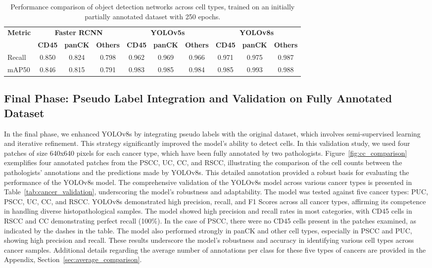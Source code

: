 \documentclass{midl} %
\begin{document}
\begin{table}[!htbp]
\centering
\caption{Performance comparison of object detection networks across cell types, trained on an initially partially annotated dataset with 250 epochs.}%
  \begin{tabular}{l|ccc|ccc|ccc}
  \toprule
  \bfseries Metric & \multicolumn{3}{c|}{\bfseries Faster RCNN} & \multicolumn{3}{c|}{\bfseries YOLOv5s} & \multicolumn{3}{c}{\bfseries YOLOv8s}\\
  & {\small \bfseries CD45} & {\small \bfseries panCK} & {\small \bfseries Others} & {\small \bfseries CD45} & {\small \bfseries panCK} & {\small \bfseries Others} & {\small \bfseries CD45} & {\small \bfseries panCK} & {\small \bfseries Others}\\
  Recall & 0.850 & 0.824 & 0.798 & 0.962 & 0.969 & 0.966 & 0.971 & 0.975 & 0.987\\
  mAP50 & 0.846 & 0.815 & 0.791 & 0.983 & 0.985 & 0.984 & 0.985 & 0.993 & 0.988 \\
  \bottomrule
  \end{tabular}
\label{tab:comparison_results}%
\end{table}

\subsection{Final Phase: Pseudo Label Integration and Validation on Fully Annotated Dataset}
In the final phase, we enhanced YOLOv8s by integrating pseudo labels with the original dataset, which involves semi-supervised learning and iterative refinement. This strategy significantly improved the model's ability to detect cells. In this validation study, we used four patches of size 640x640 pixels for each cancer type, which have been fully annotated by two pathologists. Figure~\ref{fig:cc_comparison} exemplifies four annotated patches from the PSCC, UC, CC, and RSCC, illustrating the comparison of the cell counts between the pathologists' annotations and the predictions made by YOLOv8s. This detailed annotation provided a robust basis for evaluating the performance of the YOLOv8s model. The comprehensive validation of the YOLOv8s model across various cancer types is presented in Table~\ref{tab:cancer_validation}, underscoring the model's robustness and adaptability. The model was tested against five cancer types: PUC, PSCC, UC, CC, and RSCC. YOLOv8s demonstrated high precision, recall, and F1 Scores across all cancer types, affirming its competence in handling diverse histopathological samples.
The model showed high precision and recall rates in most categories, with CD45 cells in RSCC and CC demonstrating perfect recall (100\%). In the case of PSCC, there were no CD45 cells present in the patches examined, as indicated by the dashes in the table. The model also performed strongly in panCK and other cell types, especially in PSCC and PUC, showing high precision and recall. These results underscore the model's robustness and accuracy in identifying various cell types across cancer samples. Additional details regarding the average number of annotations per class for these five types of cancers are provided in the Appendix, Section~\ref{sec:average_comparison}.
\end{document}
